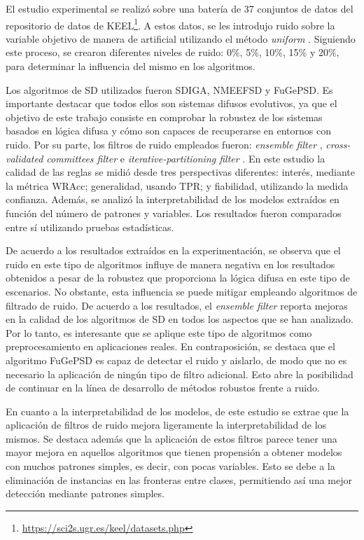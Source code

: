 \documentclass[c5paper,10pt,twoside]{book}	   	%
\begin{document}
El estudio experimental se realizó sobre una batería de 37 conjuntos de datos del repositorio de datos de KEEL\footnote{\url{https://sci2s.ugr.es/keel/datasets.php}}. A estos datos, se les introdujo ruido sobre la variable objetivo de manera de artificial utilizando el método \textit{uniform} \cite{Teng99CorrectingNoisy}. Siguiendo este proceso, se crearon diferentes niveles de ruido: 0\%, 5\%, 10\%, 15\% y 20\%, para determinar la influencia del mismo en los algoritmos.

Los algoritmos de \ac{SD} utilizados fueron SDIGA, NMEEFSD y FuGePSD. Es importante destacar que todos ellos son sistemas difusos evolutivos, ya que el objetivo de este trabajo consiste en comprobar la robustez de los sistemas basados en lógica difusa y cómo son capaces de recuperarse en entornos con ruido.  Por su parte, los filtros de ruido empleados fueron: \textit{ensemble filter} \cite{Brodley99identifyingmislabeled}, \textit{cross-validated committees filter} \cite{Verbaeten03EnsembleMethods} e \textit{iterative-partitioning filter} \cite{Khoshgoftaar07ImprovingSoftware}. En este estudio la calidad de las reglas se midió desde tres perspectivas diferentes: interés, mediante la métrica \ac{WRAcc}; generalidad, usando \ac{TPR}; y fiabilidad, utilizando la medida confianza. Además, se analizó la interpretabilidad de los modelos extraídos en función del número de patrones y variables. Los resultados fueron comparados entre sí utilizando pruebas estadísticas. 

De acuerdo a los resultados extraídos en la experimentación, se observa que el ruido en este tipo de algoritmos influye de manera negativa en los resultados obtenidos a pesar de la robustez que proporciona la lógica difusa en este tipo de escenarios. No obstante, esta influencia se puede mitigar empleando algoritmos de filtrado de ruido. De acuerdo a los resultados, el \textit{ensemble filter} reporta mejoras en la calidad de los algoritmos de \ac{SD} en todos los aspectos que se han analizado. Por lo tanto, es interesante que se aplique este tipo de algoritmos como preprocesamiento en aplicaciones reales. En contraposición, se destaca que el algoritmo FuGePSD es capaz de detectar el ruido y aislarlo, de modo que no es necesario la aplicación de ningún tipo de filtro adicional. Esto abre la posibilidad de continuar en la línea de desarrollo de métodos robustos frente a ruido.

En cuanto a la interpretabilidad de los modelos, de este estudio se extrae que la aplicación de filtros de ruido mejora ligeramente la interpretabilidad de los mismos. Se destaca además que la aplicación de estos filtros parece tener una mayor mejora en aquellos algoritmos que tienen propensión a obtener modelos con muchos patrones simples, es decir, con pocas variables. Esto se debe a la eliminación de instancias en las fronteras entre clases, permitiendo así una mejor detección mediante patrones simples.
\end{document}
